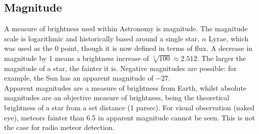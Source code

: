 \subsection{Magnitude}
A measure of brightness used within Astronomy is magnitude. The magnitude scale is logarithmic and historically based around a single star, $\alpha$ Lyrae, which was used as the 0 point, though it is now defined in terms of flux. A decrease in magnitude by 1 means a brightness increase of $\sqrt[5]{100} \approx 2.512$. The larger the magnitude of a star, the fainter it is. Negative magnitudes are possible: for example, the Sun has an apparent magnitude of $-27$.\\
Apparent magnitudes are a measure of brightness from Earth, whilst absolute magnitudes are an objective measure of brightness, being the theoretical brightness of a star from a set distance (1 parsec). For visual observation (naked eye), meteors fainter than 6.5 in apparent magnitude cannot be seen. This is not the case for radio meteor detection.